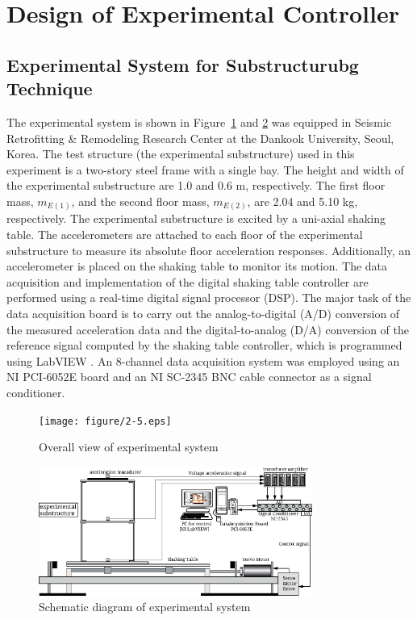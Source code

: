 \clearpage
\section{Design of Experimental Controller}
\subsection{Experimental System for Substructurubg Technique}

The experimental system is shown in Figure~\ref{fig:2-5} and \ref{fig:2-6} was equipped in Seismic Retrofitting \& Remodeling Research Center at the Dankook University, Seoul, Korea. The test structure (the experimental substructure) used in this experiment is a two-story steel frame with a single bay. The height and width of the experimental substructure are 1.0 and 0.6 m, respectively. The first floor mass, $m_{E(1)}$, and the second floor mass, $m_{E(2)}$, are 2.04 and 5.10 kg, respectively. The experimental substructure is excited by a uni-axial shaking table. The accelerometers are attached to each floor of the experimental substructure to measure its absolute floor acceleration responses. Additionally, an accelerometer is placed on the shaking table to monitor its motion. The data acquisition and implementation of the digital shaking table controller are performed using a real-time digital signal processor (DSP). The major task of the data acquisition board is to carry out the analog-to-digital (A/D) conversion of the measured acceleration data and the digital-to-analog (D/A) conversion of the reference signal computed by the shaking table controller, which is programmed using LabVIEW \citep{bishop2007labview}. An 8-channel data acquisition system was employed using an NI PCI-6052E board and an NI SC-2345 BNC cable connector as a signal conditioner.

\begin{figure}[ht]
\centering
\texttt{[image: figure/2-5.eps]}
\caption{Overall view of experimental system}
\label{fig:2-5}
\end{figure}

\begin{figure}[ht]
\centering
\includegraphics[width=0.8\textwidth] {figure/2-6.eps}
\caption{Schematic diagram of experimental system}
\label{fig:2-6}
\end{figure}

